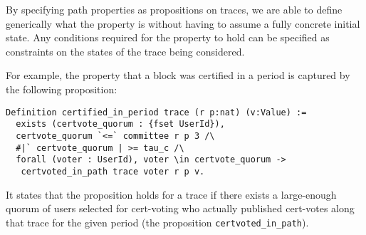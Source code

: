By specifying path properties as propositions on traces, we are able to define generically what the property is without having to assume a fully concrete initial state. Any conditions required for the property to hold can be specified as constraints on the states of the trace being considered.

For example, the property that a block was certified in a period is captured by the following proposition:
\begin{lstlisting}[language=Coq]
Definition certified_in_period trace (r p:nat) (v:Value) :=
  exists (certvote_quorum : {fset UserId}),
  certvote_quorum `<=` committee r p 3 /\
  #|` certvote_quorum | >= tau_c /\
  forall (voter : UserId), voter \in certvote_quorum ->
   certvoted_in_path trace voter r p v.
\end{lstlisting}
It states that the proposition holds for a trace if there exists a large-enough quorum of users selected for cert-voting who actually published cert-votes along that trace for the given period (the proposition \lstinline{certvoted_in_path}).
